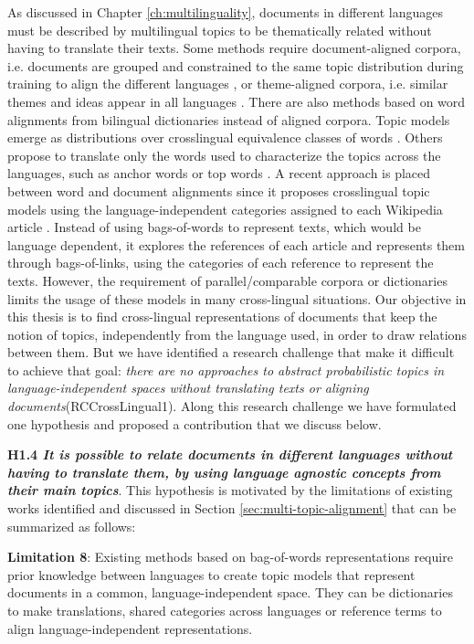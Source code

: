 As discussed in Chapter \ref{ch:multilinguality}, documents in different languages must be described by multilingual topics to be thematically related without having to translate their texts. Some methods require document-aligned corpora, i.e. documents are grouped and constrained to the same topic distribution during training to align the different languages \citep{mimno-etal-2009-polylingual, Ni2009, Fukumasu2012, Zhang2013}, or theme-aligned corpora, i.e. similar themes and ideas appear in all languages \citep{Graber2009}. There are also methods based on word alignments from bilingual dictionaries instead of aligned corpora. Topic models emerge as distributions over crosslingual equivalence classes of words \citep{Jagarlamudi2010, zhang-etal-2010-cross, shi-etal-2016-detecting, hao-paul-2018-learning}. Others propose to translate only the words used to characterize the topics across the languages, such as anchor words \citep{NEURIPS2018_28b9f8aa} or top words \citep{yang2019multilingual}. A recent approach is placed between word and document alignments since it proposes crosslingual topic models using the language-independent categories assigned to each Wikipedia article \citep{2020arXiv200911207P}. Instead of using bags-of-words to represent texts, which would be language dependent, it explores the references of each article and represents them through bags-of-links, using the categories of each reference to represent the texts. However, the requirement of parallel/comparable corpora or dictionaries limits the usage of these models in many cross-lingual situations. Our objective in this thesis is to find cross-lingual representations of documents that keep the notion of topics, independently from the language used, in order to draw relations between them. But we have identified a research challenge that make it difficult to achieve that goal: \textit{there are no approaches to abstract probabilistic topics in language-independent spaces without translating texts or aligning documents}(RCCrossLingual1). Along this research challenge we have formulated one hypothesis and proposed a contribution that we discuss below.

\textbf{H1.4 \textit{It is possible to relate documents in different languages without having to translate them, by using language agnostic concepts from their main topics}}. This hypothesis is motivated by the limitations of existing works identified and discussed in Section \ref{sec:multi-topic-alignment} that can be summarized as follows:

\textbf{Limitation 8}: Existing methods based on bag-of-words representations require prior knowledge between languages to create topic models that represent documents in a common, language-independent space. They can be dictionaries to make translations, shared categories across languages or reference terms to align language-independent representations.

